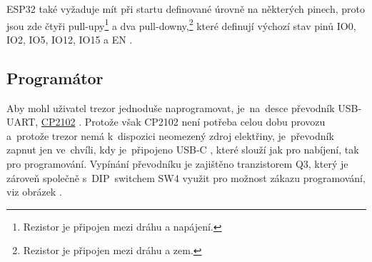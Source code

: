 ESP32 také vyžaduje mít při startu definované úrovně na některých pinech, proto jsou zde čtyři pull-upy\footnote{Rezistor je připojen mezi dráhu a napájení.} 
a dva pull-downy,\footnote{Rezistor je připojen mezi dráhu a zem.} které definují výchozí stav pinů IO0, IO2, IO5, IO12, IO15 a EN \parencite{ESP32}.
\begin{table}[h]
    \centering
    \caption{Popis funkce pinů}
    \label{tab:COMPARATION}
\end{table}

\subsection*{Programátor}
Aby mohl uživatel trezor jednoduše naprogramovat, je~na~desce převodník USB-UART, \href{https://www.silabs.com/documents/public/data-sheets/cp2102n-datasheet.pdf}{CP2102} \parencite{cp2102}.
Protože však CP2102 není potřeba celou dobu provozu a~protože trezor nemá k~dispozici neomezený zdroj elektřiny, je~převodník zapnut jen ve~chvíli, 
kdy je~připojeno USB-C , které slouží jak pro nabíjení, tak pro programování. Vypínání převodníku je zajištěno tranzistorem Q3, který je zároveň společně 
s~DIP~switchem SW4 využit pro možnost zákazu programování, viz obrázek .